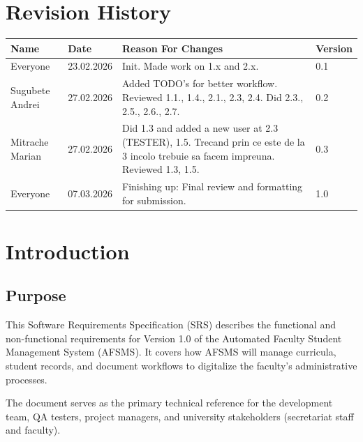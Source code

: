 \documentclass[11pt, a4paper]{article}
\begin{document}
\tableofcontents
\newpage

\section*{Revision History}

\begin{table}[htbp]
\centering
\begin{tabularx}{\textwidth}{l l X l}
\toprule
\textbf{Name} & \textbf{Date} & \textbf{Reason For Changes} & \textbf{Version} \\
\midrule
Everyone & 23.02.2026 & Init. Made work on 1.x and 2.x. & 0.1 \\
\midrule
Sugubete Andrei & 27.02.2026 & Added TODO's for better workflow. Reviewed 1.1., 1.4., 2.1., 2.3, 2.4. Did 2.3., 2.5., 2.6., 2.7. & 0.2 \\
\midrule
Mitrache Marian & 27.02.2026 & Did 1.3 and added a new user at 2.3 (TESTER), 1.5. Trecand prin ce este de la 3 incolo trebuie sa facem impreuna. Reviewed 1.3, 1.5. & 0.3 \\
\midrule
Everyone & 07.03.2026 & Finishing up: Final review and formatting for submission. & 1.0 \\
\bottomrule
\end{tabularx}
\end{table}

\newpage

\section{Introduction}

\subsection{Purpose}
This Software Requirements Specification (SRS) describes the functional and non-functional requirements for Version 1.0 of the Automated Faculty Student Management System (AFSMS). It covers how AFSMS will manage curricula, student records, and document workflows to digitalize the faculty's administrative processes.

The document serves as the primary technical reference for the development team, QA testers, project managers, and university stakeholders (secretariat staff and faculty).
\end{document}
